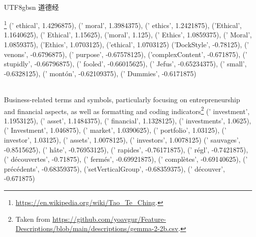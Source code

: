 


\lstset{language=python, breaklines=true}

\begin{tcolorbox}[title=Unseen concept description in Chinese]
\quad \\
\small 
\begin{CJK*}{UTF8}{gbsn}
道德经\end{CJK*}\footnote{\url{https://en.wikipedia.org/wiki/Tao_Te_Ching}.}
(' ethical', 1.4296875),
(' moral', 1.3984375),
(' ethics', 1.2421875),
('Ethical', 1.1640625),
(' Ethical', 1.15625),
('moral', 1.125),
(' Ethics', 1.0859375),
(' Moral', 1.0859375),
('Ethics', 1.0703125),
('ethical', 1.0703125)
('DockStyle', -0.78125),
(' venons', -0.6796875),
(' purpose', -0.67578125),
('complexContent', -0.671875),
(' stupidly', -0.66796875),
(' fooled', -0.66015625),
(' Jefus', -0.65234375),
(' small', -0.6328125),
(' montón', -0.62109375),
(' Dummies', -0.6171875)
\end{tcolorbox}

\begin{tcolorbox}[title=Unseen concept description in English]
\quad \\
\small 
Business-related terms and symbols, particularly focusing on entrepreneurship and financial aspects, as well as formatting and coding indicators\footnote{Taken from \url{https://github.com/yoavgur/Feature-Descriptions/blob/main/descriptions/gemma-2-2b.csv}.}
(' investment', 1.1953125),
(' asset', 1.1484375),
(' financial', 1.1328125),
(' investments', 1.0625),
(' Investment', 1.046875),
(' market', 1.0390625),
(' portfolio', 1.03125),
(' investor', 1.03125),
(' assets', 1.0078125),
(' investors', 1.0078125)
(' sauvages', -0.8515625),
(' hâte', -0.76953125),
(' rapides', -0.76171875),
(' régl', -0.7421875),
(' découvertes', -0.71875),
(' fermés', -0.69921875),
(' complètes', -0.69140625),
(' précédents', -0.68359375),
('setVerticalGroup', -0.68359375),
(' découver', -0.671875)
\end{tcolorbox}
